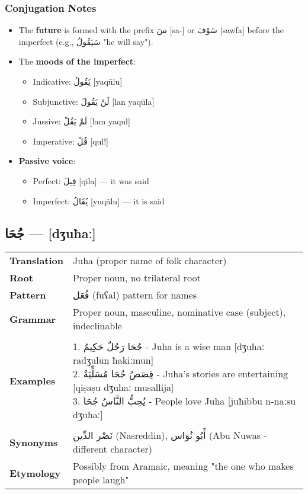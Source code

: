 \documentclass[letterpaper,12pt]{article}
\begin{document}
\subsubsection*{Conjugation Notes}
\begin{itemize}
  \item The \textbf{future} is formed with the prefix \textarabic{سَ} [sa-] or \textarabic{سَوْفَ} [sawfa] before the imperfect (e.g., \textarabic{سَيَقُولُ} "he will say").
  \item The \textbf{moods of the imperfect}: 
    \begin{itemize}
      \item Indicative: \textarabic{يَقُولُ} [yaqūlu] 
      \item Subjunctive: \textarabic{لَنْ يَقُولَ} [lan yaqūla]
      \item Jussive: \textarabic{لَمْ يَقُلْ} [lam yaqul]
      \item Imperative: \textarabic{قُلْ} [qul!]
    \end{itemize}
  \item \textbf{Passive voice}: 
    \begin{itemize}
      \item Perfect: \textarabic{قِيلَ} [qīla] — it was said
      \item Imperfect: \textarabic{يُقَالُ} [yuqālu] — it is said
    \end{itemize}
\end{itemize}

\subsection{\textarabic{جُحَا} — [dʒuħaː]}

\begin{tabular}{p{3cm}p{10cm}}
\toprule
\textbf{Translation} & Juha (proper name of folk character) \\
\textbf{Root} & Proper noun, no trilateral root \\
\textbf{Pattern} & \textarabic{فُعَل} (fuʕal) pattern for names \\
\textbf{Grammar} & Proper noun, masculine, nominative case (subject), indeclinable \\
\midrule \\
\textbf{Examples} & \makecell[l]{\parbox{9.5cm}{
1. \textarabic{جُحَا رَجُلٌ حَكِيمٌ} - Juha is a wise man [dʒuħaː radʒulun ħakiːmun]\\
2. \textarabic{قِصَصُ جُحَا مُسَلِّيَةٌ} - Juha's stories are entertaining [qiṣaṣu dʒuħaː musallija]\\
3. \textarabic{يُحِبُّ النَّاسُ جُحَا} - People love Juha [juħibbu n-naːsu dʒuħaː]
}} \\
\midrule \\
\textbf{Synonyms} & \textarabic{نَصْر الدِّين} (Nasreddin), \textarabic{أَبُو نُوَاس} (Abu Nuwas - different character) \\
\textbf{Etymology} & Possibly from Aramaic, meaning "the one who makes people laugh" \\
\bottomrule
\end{tabular}
\end{document}
